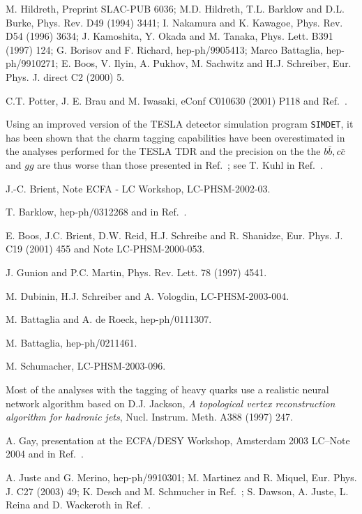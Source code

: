 \begin{thebibliography}{999}
 M. Hildreth, Preprint SLAC-PUB 6036;
M.D. Hildreth, T.L. Barklow and D.L. Burke, Phys. Rev. D49 (1994) 3441;
I. Nakamura and K. Kawagoe, Phys. Rev. D54 (1996) 3634; 
J. Kamoshita, Y. Okada and M. Tanaka, Phys. Lett. B391 (1997) 124;  
G. Borisov and F. Richard, hep-ph/9905413; 
Marco Battaglia, hep-ph/9910271; 
E. Boos, V. Ilyin, A. Pukhov, M. Sachwitz and H.J. Schreiber,
Eur. Phys. J. direct C2 (2000) 5. 

C.T. Potter, J. E. Brau and M. Iwasaki, eConf C010630 (2001) P118 and 
Ref.~\cite{Snowmass2001}.  

 Using an improved version of the TESLA detector simulation 
program {\tt SIMDET}, it has been shown that the charm tagging capabilities have
been overestimated in the analyses performed for the TESLA TDR and the  
precision on the the $b\bar b, c\bar c$ and $gg$ are thus worse than  
those presented in Ref.~\cite{TESLA}; see T. Kuhl in Ref.~\cite{LCWS}.

 J.-C. Brient, Note ECFA - LC Workshop, LC-PHSM-2002-03. 

 T. Barklow, hep-ph/0312268 and in Ref.~\cite{Houches2003}.  

 E. Boos, J.C. Brient, D.W. Reid, H.J. Schreibe and 
R. Shanidze, Eur. Phys. J. C19 (2001) 455 and Note LC-PHSM-2000-053.  

 J. Gunion and P.C. Martin, Phys. Rev. Lett. 78 (1997) 
4541. 
 
 M. Dubinin, H.J. Schreiber and A. Vologdin, 
LC-PHSM-2003-004. 

 M. Battaglia and A. de Roeck, hep-ph/0111307. 

  M. Battaglia, hep-ph/0211461.

 M. Schumacher, LC-PHSM-2003-096. 

 Most of the analyses with the tagging of heavy quarks use 
a realistic neural network algorithm based on D.J. Jackson, {\it A topological 
vertex reconstruction algorithm for hadronic jets}, Nucl. Instrum. Meth. A388 
(1997) 247.

 A.  Gay, presentation at the ECFA/DESY Workshop, 
Amsterdam 2003 LC--Note 2004 and in Ref.~\cite{Desch}.  

 A. Juste and G. Merino, hep-ph/9910301;
M. Martinez and R. Miquel, Eur. Phys. J. C27 (2003) 49;
K. Desch and M. Schmucher in Ref.~\cite{LHC-LC};
S. Dawson, A. Juste, L. Reina and D. Wackeroth in Ref.~\cite{LHC-LC}.    


\end{thebibliography}
